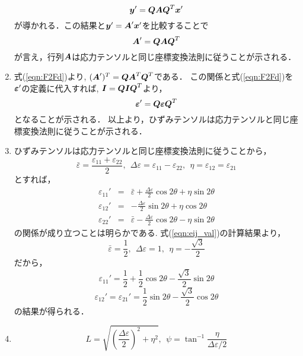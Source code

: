 \documentclass[10pt,a4j]{jarticle}
\begin{document}
\begin{enumerate}
	\begin{equation}
		\mbox{\boldmath $y$}'
		=
		\mbox{\boldmath $Q$}\mbox{\boldmath $A$}\mbox{\boldmath $Q$}^T \mbox{\boldmath $x$}'
	\end{equation}
	が導かれる．この結果と$\mbox{\boldmath $y$}' = \mbox{\boldmath $A$}'\mbox{\boldmath $x$}'$を比較することで
	\begin{equation}
		\mbox{\boldmath $A$}'=\mbox{\boldmath $Q$} \mbox{\boldmath $A$}\mbox{\boldmath $Q$}^T
		\label{eqn:F2Fd}
	\end{equation}
	が言え，行列$\mbox{\boldmath $A$}$は応力テンソルと同じ座標変換法則に従うことが示される．
\item
	式(\ref{eqn:F2Fd})より, $(\mbox{\boldmath $A$}')^T=\mbox{\boldmath $Q$}\mbox{\boldmath $A$}^T\mbox{\boldmath $Q$}^T$である．
	この関係と式(\ref{eqn:F2Fd})を$\mbox{\boldmath $\varepsilon$}'$の定義に代入すれば, 
	$\mbox{\boldmath $I$}=\mbox{\boldmath $Q$}\mbox{\boldmath $I$}\mbox{\boldmath $Q$}^T$より，
	\begin{equation}
		\mbox{\boldmath $\varepsilon$}'=\mbox{\boldmath $Q$}\mbox{\boldmath $\varepsilon$}\mbox{\boldmath $Q$}^T
	\end{equation}
	となることが示される．
	以上より，ひずみテンソルは応力テンソルと同じ座標変換法則に従うことが示される．
\item
	ひずみテンソルは応力テンソルと同じ座標変換法則に従うことから，
	\begin{equation}
		\bar \varepsilon = \frac{\varepsilon_{11}+ \varepsilon_{22}}{2} , \ \ 
		\Delta  \varepsilon = \varepsilon_{11}- \varepsilon_{22}, \ \ 
		\eta = \varepsilon_{12}=\varepsilon_{21}
	\end{equation}
	とすれば，
	\begin{eqnarray}
		\varepsilon_{11}' &=& 
			\bar \varepsilon + \frac{\Delta \varepsilon}{2} \cos 2\theta + \eta \sin 2\theta 
			\label{eqn:e11d}
			\\
		\varepsilon_{12}' &=& 
			-\frac{\Delta \varepsilon}{2} \sin 2\theta + \eta \cos 2\theta 
			\label{eqn:e12d}
			\\
		\varepsilon_{22}' &=& 
			\bar \varepsilon - \frac{\Delta \varepsilon}{2} \cos 2\theta - \eta \sin 2\theta 
			\label{eqn:e22d}
	\end{eqnarray}
	の関係が成り立つことは明らかである.
	式(\ref{eqn:eij_val})の計算結果より，
	\[
		\bar\varepsilon = \frac{1}{2}, \ \ \Delta \varepsilon =1, \ \ \eta = -\frac{\sqrt{3}}{2}
	\]
	だから，
	\[
		\varepsilon_{11}'=
		\frac{1}{2} + \frac{1}{2} \cos 2\theta -\frac{\sqrt{3}}{2} \sin 2\theta 
	\]
	\[
		\varepsilon_{12}'=\varepsilon_{21}'
		=
		 \frac{1}{2} \sin 2\theta -\frac{\sqrt{3}}{2} \cos 2\theta 
	\]
	の結果が得られる．
\item
	\begin{equation}
		L=\sqrt{\left(\frac{\Delta \varepsilon}{2}\right)^2 + \eta ^2 }, 
		\ \ 
		\psi=\tan^{-1}\frac{\eta}{\Delta \varepsilon/2}

\end{equation}
\end{enumerate}
\end{document}
